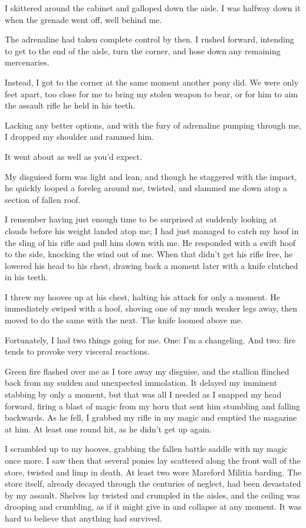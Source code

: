 I skittered around the cabinet and galloped down the aisle. I was halfway down it when the grenade went off, well behind me.

The adrenaline had taken complete control by then. I rushed forward, intending to get to the end of the aisle, turn the corner, and hose down any remaining mercenaries.

Instead, I got to the corner at the same moment another pony did. We were only feet apart, too close for me to bring my stolen weapon to bear, or for him to aim the assault rifle he held in his teeth.

Lacking any better options, and with the fury of adrenaline pumping through me, I dropped my shoulder and rammed him.

It went about as well as you’d expect.

My disguised form was light and lean, and though he staggered with the impact, he quickly looped a foreleg around me, twisted, and slammed me down atop a section of fallen roof.

I remember having just enough time to be surprised at suddenly looking at clouds before his weight landed atop me; I had just managed to catch my hoof in the sling of his rifle and pull him down with me. He responded with a swift hoof to the side, knocking the wind out of me. When that didn’t get his rifle free, he lowered his head to his chest, drawing back a moment later with a knife clutched in his teeth.

I threw my hooves up at his chest, halting his attack for only a moment. He immediately swiped with a hoof, shoving one of my much weaker legs away, then moved to do the same with the next. The knife loomed above me.

Fortunately, I had two things going for me. One: I’m a changeling. And two: fire tends to provoke very visceral reactions.

Green fire flashed over me as I tore away my disguise, and the stallion flinched back from my sudden and unexpected immolation. It delayed my imminent stabbing by only a moment, but that was all I needed as I snapped my head forward, firing a blast of magic from my horn that sent him stumbling and falling backwards. As he fell, I grabbed my rifle in my magic and emptied the magazine at him. At least one round hit, as he didn’t get up again.

I scrambled up to my hooves, grabbing the fallen battle saddle with my magic once more. I saw then that several ponies lay scattered along the front wall of the store, twisted and limp in death. At least two wore Mareford Militia barding. The store itself, already decayed through the centuries of neglect, had been devastated by my assault. Shelves lay twisted and crumpled in the aisles, and the ceiling was drooping and crumbling, as if it might give in and collapse at any moment. It was hard to believe that anything had survived.

